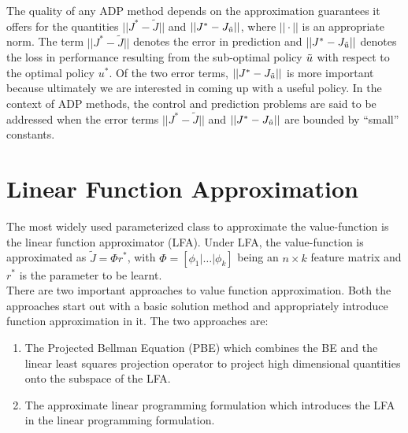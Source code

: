The quality of any ADP method depends on the approximation guarantees it offers for the quantities $||J^*-\tilde{J}||$ and $||J^*-J_{\tilde{u}}||$, where $||\cdot||$ is an appropriate norm. The term  $||J^*-\tilde{J}||$ denotes the error in prediction and $||J^*-J_{\tilde{u}}||$ denotes the loss in performance resulting from the sub-optimal policy $\tilde{u}$ with respect to the optimal policy $u^*$. Of the two error terms, $||J^*-J_{\tilde{u}}||$ is more important because ultimately we are interested in coming up with a useful policy. In the context of ADP methods, the control and prediction problems are said to be addressed when the error terms $||J^*-\tilde{J}||$ and $||J^*-J_{\tilde{u}}||$ are bounded by ``small'' constants.\\
\section{Linear Function Approximation}
The most widely used parameterized class to approximate the value-function is the linear function approximator (LFA). Under LFA, the value-function is approximated as $\tilde{J}=\Phi r^*$, with $\Phi=[\phi_1|\ldots|\phi_k]$ being an $n\times k$ feature matrix and $r^*$ is the parameter to be learnt.\\
There are two important approaches to value function approximation. Both the approaches start out with a basic solution method and appropriately introduce function approximation in it. The two approaches are:
\begin{enumerate}
\item The Projected Bellman Equation (PBE) which combines the BE and the linear least squares projection operator to project high dimensional quantities onto the subspace of the LFA.
\item The approximate linear programming formulation which introduces the LFA in the linear programming formulation. 
\end{enumerate}

